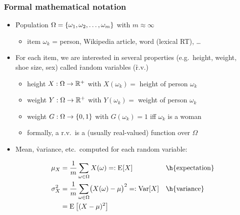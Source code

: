 \documentclass[t]{beamer} %
\begin{document}
\begin{frame}
  \frametitle{Formal mathematical notation}

  \begin{itemize}
  \item \h{Population} $\Omega = \{\omega_1, \omega_2, \ldots, \omega_m\}$
    with $m\approx \infty$
    \begin{itemize}
    \item item $\omega_k$ = person, Wikipedia article, word (lexical
      RT), \ldots
    \end{itemize}
  \item<2-> For each item, we are interested in several properties (e.g.\ height,
    weight, shoe size, sex) called \h{random variables} (\h{r.v.})
    \begin{itemize}
    \item height $X: \Omega\to \mathbb{R}^+$ with $X(\omega_k) =$ height of person $\omega_k$
    \item weight $Y: \Omega\to \mathbb{R}^+$ with $Y(\omega_k) =$ weight of person $\omega_k$
    \item weight $G: \Omega\to \{0,1\}$ with $G(\omega_k) = 1$ iff
      $\omega_k$ is a woman
    \item[\hand] formally, a r.v.\ is a (usually real-valued) function over
      $\Omega$
    \end{itemize}
  \item<3-> \h{Mean}, \h{variance}, etc.\ computed for each random variable:
    \begin{small}
    \begin{align*}
      \mu_X &= \frac{1}{m} \sum_{\omega\in \Omega} X(\omega) \eqcolon \Exp{X}
      && \text{\h{expectation}} \\
      \sigma^2_X &= \frac{1}{m} \sum_{\omega\in \Omega} \bigl( X(\omega) - \mu \bigr)^2 
      \eqcolon \Var{X}  && \text{\h{variance}} \\
      &= \Expscale{(X - \mu)^2}
    \end{align*}
    \end{small}
  \end{itemize}
  \ungap[1.5]
\end{frame}
\end{document}
